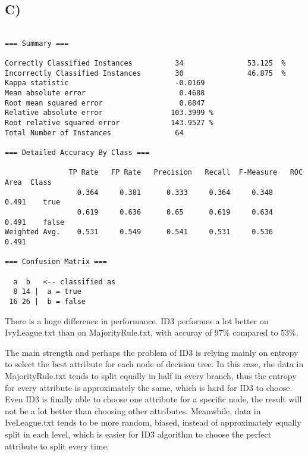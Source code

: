 \documentclass[11pt]{article}
\begin{document}
\subsection*{C)}

\begin{lstlisting}

=== Summary ===

Correctly Classified Instances          34               53.125  %
Incorrectly Classified Instances        30               46.875  %
Kappa statistic                         -0.0169
Mean absolute error                      0.4688
Root mean squared error                  0.6847
Relative absolute error                103.3999 %
Root relative squared error            143.9527 %
Total Number of Instances               64     

=== Detailed Accuracy By Class ===

               TP Rate   FP Rate   Precision   Recall  F-Measure   ROC Area  Class
                 0.364     0.381      0.333     0.364     0.348      0.491    true
                 0.619     0.636      0.65      0.619     0.634      0.491    false
Weighted Avg.    0.531     0.549      0.541     0.531     0.536      0.491

=== Confusion Matrix ===

  a  b   <-- classified as
  8 14 |  a = true
 16 26 |  b = false
\end{lstlisting}

\noindent There is a huge difference in performance. ID3 performes a lot better on IvyLeague.txt than on MajorityRule.txt, with accuray of $97\%$ compared to $53\%$.

\noindent The main strength and perhaps the problem of ID3 is relying mainly on entropy to select the best attribute for each node of decision tree. In this case, rhe data in MajorityRule.txt tends to split equally in half in every branch, thus the entropy for every attribute is approximately the same, which is hard for ID3 to choose. Even ID3 is finally able to choose one attribute for a specific node, the result will not be a lot better than choosing other attributes. Meanwhile, data in IveLeague.txt tends to be more random, biased, instead of approximately equally split in each level, which is easier for ID3 algorithm to choose the perfect attribute to split every time.\\
\end{document}
